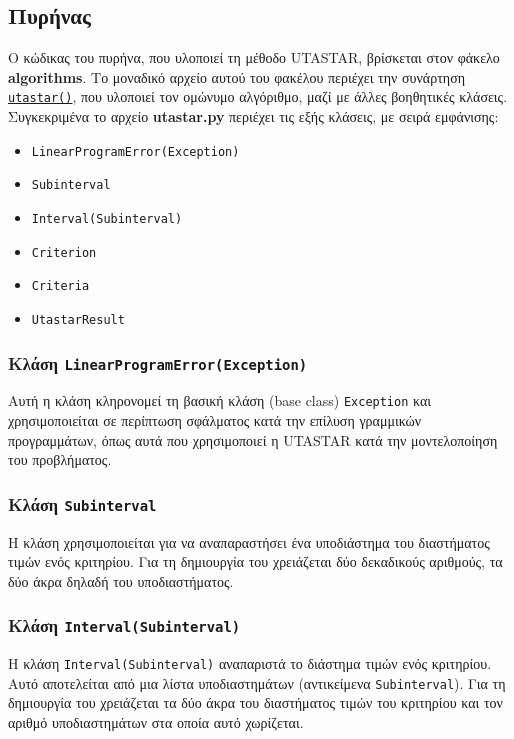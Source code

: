 \documentclass[11pt,a4paper,titlepage]{article}
\numberwithin{equation}{section}
\begin{document}
\subsection{Πυρήνας}
\label{ssec:impl-kernel}
Ο κώδικας του πυρήνα, που υλοποιεί τη μέθοδο UTASTAR, βρίσκεται στον φάκελο \textbf{algorithms}. Το μοναδικό αρχείο αυτού του φακέλου περιέχει την συνάρτηση \hyperref[sssec:utastar()]{\texttt{utastar()}}, που υλοποιεί τον ομώνυμο αλγόριθμο, μαζί με άλλες βοηθητικές κλάσεις. Συγκεκριμένα το αρχείο \textbf{utastar.py} περιέχει τις εξής κλάσεις, με σειρά εμφάνισης:

\begin{itemize}
    \item \texttt{LinearProgramError(Exception)}
    \item \texttt{Subinterval}
    \item \texttt{Interval(Subinterval)}
    \item \texttt{Criterion}
    \item \texttt{Criteria}
    \item \texttt{UtastarResult}
\end{itemize}

\subsubsection{Κλάση \texttt{LinearProgramError(Exception)}}
\label{sssec:LinearProgramError}
Αυτή η κλάση κληρονομεί τη βασική κλάση (base class) \texttt{Exception} και χρησιμοποιείται σε περίπτωση σφάλματος κατά την επίλυση γραμμικών προγραμμάτων, όπως αυτά που χρησιμοποιεί η UTASTAR κατά την μοντελοποίηση του προβλήματος.

\subsubsection{Κλάση \texttt{Subinterval}}
\label{sssec:Subinterval}
Η κλάση χρησιμοποιείται για να αναπαραστήσει ένα υποδιάστημα του διαστήματος τιμών ενός κριτηρίου. Για τη δημιουργία του χρειάζεται δύο δεκαδικούς αριθμούς, τα δύο άκρα δηλαδή του υποδιαστήματος.

\subsubsection{Κλάση \texttt{Ιnterval(Subinterval)}}
\label{sssec:Ιnterval}
Η κλάση \texttt{Ιnterval(Subinterval)} αναπαριστά το διάστημα τιμών ενός κριτηρίου. Αυτό αποτελείται από μια λίστα υποδιαστημάτων (αντικείμενα \texttt{Subinterval}). Για τη δημιουργία του χρειάζεται τα δύο άκρα του διαστήματος τιμών του κριτηρίου και τον αριθμό υποδιαστημάτων στα οποία αυτό χωρίζεται.
\end{document}
